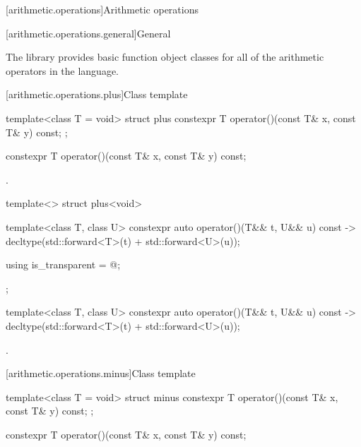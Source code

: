 [arithmetic.operations]{Arithmetic operations}

[arithmetic.operations.general]{General}

\pnum
The library provides basic function object classes for all of the arithmetic
operators in the language.

[arithmetic.operations.plus]{Class template }

%
\begin{itemdecl}
template<class T = void> struct plus {
  constexpr T operator()(const T& x, const T& y) const;
};
\end{itemdecl}

%
\begin{itemdecl}
constexpr T operator()(const T& x, const T& y) const;
\end{itemdecl}

\begin{itemdescr}
\pnum
\returns
{}.
\end{itemdescr}

%
\begin{itemdecl}
template<> struct plus<void> {
  template<class T, class U> constexpr auto operator()(T&& t, U&& u) const
    -> decltype(std::forward<T>(t) + std::forward<U>(u));

  using is_transparent = @\unspec@;
};
\end{itemdecl}

%
\begin{itemdecl}
template<class T, class U> constexpr auto operator()(T&& t, U&& u) const
    -> decltype(std::forward<T>(t) + std::forward<U>(u));
\end{itemdecl}

\begin{itemdescr}
\pnum
\returns
{}.
\end{itemdescr}

[arithmetic.operations.minus]{Class template }

%
\begin{itemdecl}
template<class T = void> struct minus {
  constexpr T operator()(const T& x, const T& y) const;
};
\end{itemdecl}

%
\begin{itemdecl}
constexpr T operator()(const T& x, const T& y) const;
\end{itemdecl}

